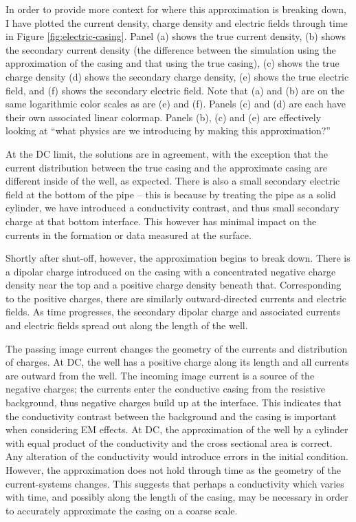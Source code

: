

In order to provide more context for where this approximation is breaking down, I have plotted the current density, charge density and electric fields through time in Figure \ref{fig:electric-casing}. Panel (a) shows the true current density, (b) shows the secondary current density (the difference between the simulation using the approximation of the casing and that using the true casing), (c) shows the true charge density (d) shows the secondary charge density, (e) shows the true electric field, and (f) shows the secondary electric field. Note that (a) and (b) are on the same logarithmic color scales as are (e) and (f). Panels (c) and (d) are each have their own associated linear colormap. Panels (b), (c) and (e) are effectively looking at ``what physics are we introducing by making this approximation?''



At the DC limit, the solutions are in agreement, with the exception that the current distribution between the true casing and the approximate casing are different inside of the well, as expected. There is also a small secondary electric field at the bottom of the pipe -- this is because by treating the pipe as a solid cylinder, we have introduced a conductivity contrast, and thus small secondary charge at that bottom interface. This however has minimal impact on the currents in the formation or data measured at the surface.

Shortly after shut-off, however, the approximation begins to break down. There is a dipolar charge introduced on the casing with a concentrated negative charge density near the top and a positive charge density beneath that. Corresponding to the positive charges, there are similarly outward-directed currents and electric fields. As time progresses, the secondary dipolar charge and associated currents and electric fields spread out along the length of the well.

The passing image current changes the geometry of the currents and distribution of charges. At DC, the well has a positive charge along its length and all currents are outward from the well. The incoming image current is a source of the negative charges; the currents enter the conductive casing from the resistive background, thus negative charges build up at the interface. This indicates that the conductivity contrast between the background and the casing is important when considering EM effects. At DC, the approximation of the well by a cylinder with equal product of the conductivity and the cross sectional area is correct. Any alteration of the conductivity would introduce errors in the initial condition. However, the approximation does not hold through time as the geometry of the current-systems changes. This suggests that perhaps a conductivity which varies with time, and possibly along the length of the casing, may be necessary in order to accurately approximate the casing on a coarse scale.


